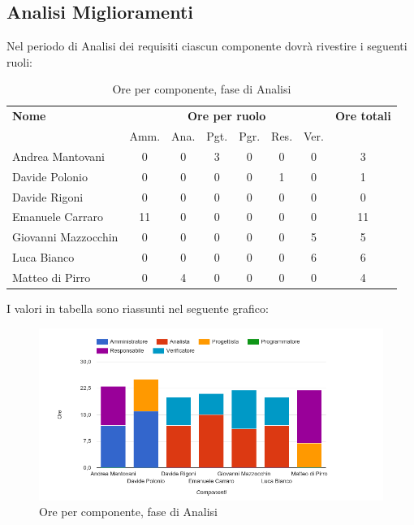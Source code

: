 \pagebreak
\subsection{Analisi Miglioramenti}
Nel periodo di Analisi dei requisiti ciascun componente dovrà rivestire i seguenti ruoli:

\begin{table}[H]
\begin{tabular}{lccccccc}
\toprule
    \textbf{Nome}  & \multicolumn{6}{c}{\textbf{Ore per ruolo}} & \textbf{Ore totali} \\
     & Amm. & Ana. & Pgt. & Pgr. & Res. & Ver. & \\
    \midrule
    
	   Andrea Mantovani & 0 & 0 & 3 & 0 & 0 & 0 & 3 \\
	     Davide Polonio & 0 & 0 & 0 & 0 & 1 & 0 & 1 \\
	      Davide Rigoni & 0 & 0 & 0 & 0 & 0 & 0 & 0 \\
	   Emanuele Carraro & 11 & 0 & 0 & 0 & 0 & 0 & 11 \\
	Giovanni Mazzocchin & 0 & 0 & 0 & 0 & 0 & 5 & 5 \\
	        Luca Bianco & 0 & 0 & 0 & 0 & 0 & 6 & 6 \\
	    Matteo di Pirro & 0 & 4 & 0 & 0 & 0 & 0 & 4 \\
    
    \bottomrule
\end{tabular}
\caption{Ore per componente, fase di Analisi}
\end{table}


I valori in tabella sono riassunti nel seguente grafico: \\ 

    \begin{figure}[H]
      \begin{center}
        \includegraphics[width=12cm]{res/img/orePerComponenteAnalisi.png}
      \caption{Ore per componente, fase di Analisi}
      \end{center} 
    \end{figure}    
    
